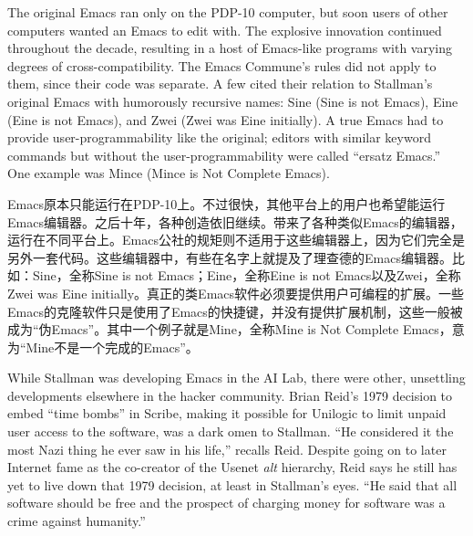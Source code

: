 \ifdefined\eng
The original Emacs ran only on the PDP-10 computer, but soon users of other computers wanted an Emacs to edit with. The explosive innovation continued throughout the decade, resulting in a host of Emacs-like programs with varying degrees of cross-compatibility. The Emacs Commune's rules did not apply to them, since their code was separate. A few cited their relation to Stallman's original Emacs with humorously recursive names: Sine (Sine is not Emacs), Eine (Eine is not Emacs), and Zwei (Zwei was Eine initially). A true Emacs had to provide user-programmability like the original; editors with similar keyword commands but without the user-programmability were called ``ersatz Emacs.''  One example was Mince (Mince is Not Complete Emacs). 
\fi

\ifdefined\chs
Emacs原本只能运行在PDP-10上。不过很快，其他平台上的用户也希望能运行Emacs编辑器。之后十年，各种创造依旧继续。带来了各种类似Emacs的编辑器，运行在不同平台上。Emacs公社的规矩则不适用于这些编辑器上，因为它们完全是另外一套代码。这些编辑器中，有些在名字上就提及了理查德的Emacs编辑器。比如：Sine，全称Sine is not Emacs；Eine，全称Eine is not Emacs以及Zwei，全称Zwei was Eine initially。真正的类Emacs软件必须要提供用户可编程的扩展。一些Emacs的克隆软件只是使用了Emacs的快捷键，并没有提供扩展机制，这些一般被成为“伪Emacs”。其中一个例子就是Mine，全称Mine is Not Complete Emacs，意为“Mine不是一个完成的Emacs”。
\fi

\ifdefined\eng
While Stallman was developing Emacs in the AI Lab, there were other, unsettling developments elsewhere in the hacker community. Brian Reid's 1979 decision to embed ``time bombs'' in Scribe, making it possible for Unilogic to limit unpaid user access to the software, was a dark omen to Stallman. ``He considered it the most Nazi thing he ever saw in his life,'' recalls Reid. Despite going on to later Internet fame as the co-creator of the Usenet \textit{alt} hierarchy, Reid says he still has yet to live down that 1979 decision, at least in Stallman's eyes. ``He said that all software should be free and the prospect of charging money for software was a crime against humanity.''
\fi

